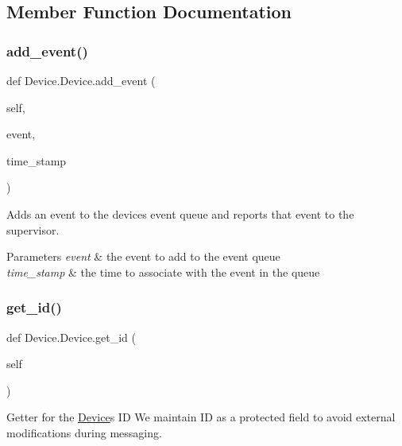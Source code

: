 \subsection{Member Function Documentation}
\mbox{\label{class_device_1_1_device_a48c0cd986e11f67d2373871ade40992e}} 
\subsubsection{\texorpdfstring{add\+\_\+event()}{add\_event()}}
{\footnotesize\ttfamily def Device.\+Device.\+add\+\_\+event (\begin{DoxyParamCaption}\item[{}]{self,  }\item[{}]{event,  }\item[{}]{time\+\_\+stamp }\end{DoxyParamCaption})}



Adds an event to the device\textquotesingle{}s event queue and reports that event to the supervisor. 


\begin{DoxyParams}{Parameters}
{\em event} & the event to add to the event queue \\
\hline
{\em time\+\_\+stamp} & the time to associate with the event in the queue \\
\hline
\end{DoxyParams}
\mbox{\label{class_device_1_1_device_a3aef2a6e416795690e9b697b3fcf4d76}} 
\subsubsection{\texorpdfstring{get\+\_\+id()}{get\_id()}}
{\footnotesize\ttfamily def Device.\+Device.\+get\+\_\+id (\begin{DoxyParamCaption}\item[{}]{self }\end{DoxyParamCaption})}



Getter for the \hyperlink{class_device_1_1_device}{Device}\textquotesingle{}s ID We maintain ID as a protected field to avoid external modifications during messaging. 

